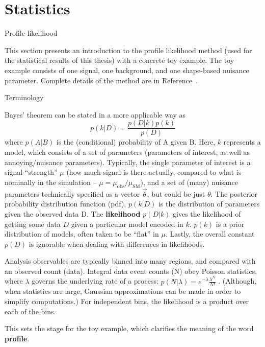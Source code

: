 \chapter{Statistics}
\label{app:statistics}

\begin{section}{Profile likelihood}


This section presents an introduction to the profile likelihood method
(used for the statistical results of this thesis) with a concrete toy example.
The toy example consists of one signal, one background, and one shape-based
nuisance parameter. Complete details of the method are in Reference~\cite{STAT:Cowan2010js}.


\begin{subsection}{Terminology}

Bayes' theorem can be stated in a more applicable way as
\begin{equation}
p(k|D) = \frac{p(D|k)p(k)}{p(D)}
\end{equation}
where $p(A|B)$ is the (conditional) probability of A given B.
Here, $k$ represents a model, which consists of a set of parameters 
(parameters of interest, as well as annoying/nuisance parameters). 
Typically, the single parameter of interest is a signal ``strength'' $\mu$
    (how much signal is there actually, compared to what is nominally in the simulation -- $\mu = \mu_\mathrm{obs}/\mu_\mathrm{SM}$), 
 and a set of (many) nuisance parameters technically specified
as a vector $\vec{\theta}$, but could be just $\theta$. The posterior probability 
distribution function (pdf), $p(k|D)$ is the distribution of parameters given the observed
data D. The \textbf{likelihood} $p(D|k)$ gives the likelihood of getting some data $D$
given a particular model encoded in $k$. $p(k)$ is a prior distribution of models, often
taken to be ``flat'' in $\mu$. Lastly, the overall constant $p(D)$ is ignorable when dealing
with differences in likelihoods.

Analysis observables are typically binned into many regions, and compared with an observed count (data).
Integral data event counts (N) obey Poisson statistics, where $\lambda$ governs the underlying
rate of a process: $p(N|\lambda) = e^{-\lambda}\frac{\lambda^N}{N!}$ .
(Although, when statistics are large, Gaussian approximations can be made in order to simplify computations.)
For independent bins, the likelihood is a product over each of the bins.

This sets the stage for the toy example, which clarifies the meaning of the word \textbf{profile}.




\end{subsection}
\end{section}
